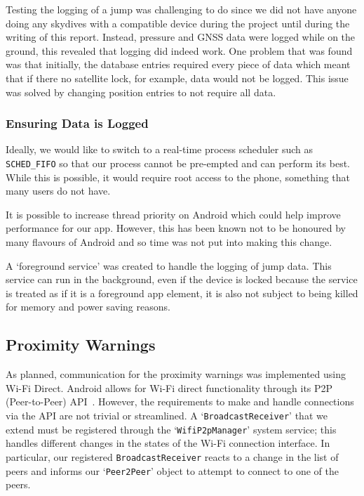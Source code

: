 Testing the logging of a jump was challenging to do since we did not have anyone doing any skydives with a compatible device during the project until during the writing of this report. Instead, pressure and GNSS data were logged while on the ground, this revealed that logging did indeed work. One problem that was found was that initially, the database entries required every piece of data which meant that if there no satellite lock, for example, data would not be logged. This issue was solved by changing position entries to not require all data.

\subsubsection{Ensuring Data is Logged}
Ideally, we would like to switch to a real-time process scheduler such as \texttt{SCHED\_FIFO} so that our process cannot be pre-empted and can perform its best. While this is possible, it would require root access to the phone, something that many users do not have.

It is possible to increase thread priority on Android which could help improve performance for our app. However, this has been known not to be honoured by many flavours of Android and so time was not put into making this change.

A `foreground service' was created to handle the logging of jump data. This service can run in the background, even if the device is locked because the service is treated as if it is a foreground app element, it is also not subject to being killed for memory and power saving reasons.

\subsection{Proximity Warnings}
As planned, communication for the proximity warnings was implemented using Wi-Fi Direct. Android allows for Wi-Fi direct functionality through its P2P (Peer-to-Peer) API~\cite{_creating_????}. However, the requirements to make and handle connections via the API are not trivial or streamlined. A `\texttt{BroadcastReceiver}' that we extend must be registered through the `\texttt{WifiP2pManager}' system service; this handles different changes in the states of the Wi-Fi connection interface. In particular, our registered \texttt{BroadcastReceiver} reacts to a change in the list of peers and informs our `\texttt{Peer2Peer}' object to attempt to connect to one of the peers.


